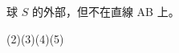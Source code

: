 \begin{QUESTIONS}
\begin{QUESTION}
\begin{QBODY}
\begin{QOPS}
				\QOP 球 $S$ 的外部，但不在直線 AB 上。
			\end{QOPS}
        \end{QBODY}
        \begin{QFROMS}
        \end{QFROMS}
        \begin{QTAGS}\end{QTAGS}
        \begin{QANS}
            (2)(3)(4)(5)
        \end{QANS}
        \begin{QSOLLIST}
        \end{QSOLLIST}
        \begin{QEMPTYSPACE}
        \end{QEMPTYSPACE}
    \end{QUESTION}
\end{QUESTIONS}
